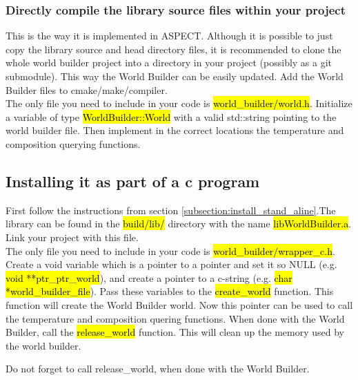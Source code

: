 \documentclass{book}
\newcommand{\WB}{{World Builder}}
\newcommand{\aspect}{{ASPECT}}
\begin{document}
\subsubsection{Directly compile the library source files within your project}
\label{subsubsection:direct_compile_library_source}
This is the way it is implemented in \aspect{}. Although it is possible to just copy the library source and head directory files, it is recommended to clone the whole world builder project into a directory in your project (possibly as a git submodule). This way the \WB{} can be easily updated. Add the \WB{} files to cmake/make/compiler. 
\\
The only file you need to include in your code is \hl{world\_builder/world.h}. Initialize a variable of type \hl{WorldBuilder::World} with a valid std::string pointing to the world builder file. Then implement in the correct locations the temperature and composition querying functions.
\subsection{Installing it as part of a c program}
First follow the instructions from section \ref{subsection:install_stand_aline}.The library can be found in the \hl{build/lib/} directory with the name \hl{libWorldBuilder.a}. Link your project with this file. 
\\
The only file you need to include in your code is \hl{world\_builder/wrapper\_c.h}. Create a void variable which is a pointer to a pointer and set it so NULL (e.g. \hl{void **ptr\_ptr\_world}), and create a pointer to a c-string (e.g. \hl{char *world\_builder\_file}). Pass these variables to the \hl{create\_world} function. This function will create the \WB{} world. Now this pointer can be used to call the temperature and composition quering functions. When done with the \WB{}, call the \hl{release\_world} function. This will clean up the memory used by the world builder.
\begin{remark}
Do not forget to call release\_world, when done with the \WB{}.
\end{remark}
\end{document}
